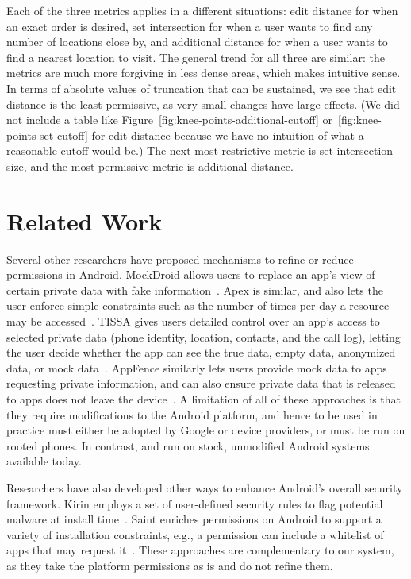 Each of the three metrics applies in a different situations: edit
distance for when an exact order is desired, set intersection for when
a user wants to find any number of locations close by, and additional
distance for when a user wants to find a nearest location to visit.
The general trend for all three are similar: the metrics are much
more forgiving in less dense areas, which makes intuitive sense. In
terms of absolute values of truncation that can be sustained, we see
that edit distance is the least permissive, as very small changes have
large effects. (We did not include a table like
Figure~\ref{fig:knee-points-additional-cutoff}
or~\ref{fig:knee-points-set-cutoff} for edit distance because we have
no intuition of what a reasonable cutoff would be.) The next most
restrictive metric is set intersection size, and the most permissive
metric is additional distance.

\section{Related Work}

Several other researchers have proposed mechanisms to refine or reduce
permissions in Android. MockDroid allows users to replace an
app's view of certain private data with fake
information~\cite{mockdroid}. Apex is similar, and also lets 
the user enforce simple constraints such as the
number of times per day a resource may be accessed~\cite{apex}. TISSA
gives users detailed control over an app's access to selected private data
(phone identity, location, contacts, and the call log), letting the
user decide whether the app can see the true data, empty data,
anonymized data, or mock data~\cite{zhou2011taming}. AppFence
similarly lets users provide mock data to apps requesting private
information, and can also ensure private data that is released to apps
does not leave the device~\cite{Hornyack:2011}.  A
limitation of all of these approaches is that they require
modifications to the Android platform, and hence to be used in
practice must either be
adopted by Google or device providers, or must be run on rooted
phones. In contrast, \rewriter and \lib run on stock, unmodified
Android systems available today.

Researchers have also developed other ways to enhance Android's
overall security framework. Kirin employs a set of user-defined
security rules to flag potential malware at install
time~\cite{enck2009lightweight}. Saint enriches permissions on Android
to support a variety of installation constraints, e.g., a permission
can include a whitelist of apps that may request
it~\cite{ongtang2009semantically}. These approaches are complementary
to our system, as they take the platform permissions as is and do not
refine them.


